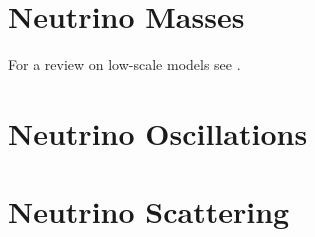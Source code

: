 \section{Neutrino Masses}

For a review on low-scale models see \cite{Boucenna:2014zba}.

\section{Neutrino Oscillations}

\section{Neutrino Scattering}
